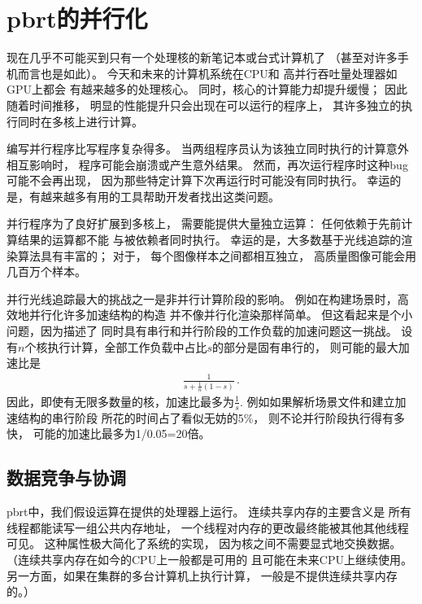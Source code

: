 \section{pbrt的并行化}\label{sec:pbrt的并行化}

现在几乎不可能买到只有一个处理核的新笔记本或台式计算机了
（甚至对许多手机而言也是如此）。
今天和未来的计算机系统在CPU和
高并行吞吐量处理器如GPU上都会
有越来越多的处理核心。
同时，核心的计算能力却提升缓慢；
因此随着时间推移，
明显的性能提升只会出现在可以运行的程序上，
其许多独立的执行同时在多核上进行计算。

编写并行程序比写程序复杂得多。
当两组程序员认为该独立同时执行的计算意外相互影响时，
程序可能会崩溃或产生意外结果。
然而，再次运行程序时这种bug可能不会再出现，
因为那些特定计算下次再运行时可能没有同时执行。
幸运的是，有越来越多有用的工具帮助开发者找出这类问题。

并行程序为了良好扩展到多核上，
需要能提供大量独立运算：
任何依赖于先前计算结果的运算都不能
与被依赖者同时执行。
幸运的是，大多数基于光线追踪的渲染算法具有丰富的；
对于，
每个图像样本之间都相互独立，
高质量图像可能会用几百万个样本。

并行光线追踪最大的挑战之一是非并行计算阶段的影响。
例如在构建场景时，高效地并行化许多加速结构的构造
并不像并行化渲染那样简单。
但这看起来是个小问题，因为描述了
同时具有串行和并行阶段的工作负载的加速问题这一挑战。
设有$n$个核执行计算，全部工作负载中占比$s$的部分是固有串行的，
则可能的最大加速比是
\begin{align*}
    \frac{1}{\displaystyle s+\frac{1}{n}(1-s)}\, .
\end{align*}
因此，即使有无限多数量的核，加速比最多为$\displaystyle\frac{1}{s}$.
例如如果解析场景文件和建立加速结构的串行阶段
所花的时间占了看似无妨的5\%，
则不论并行阶段执行得有多快，
可能的加速比最多为1/0.05=20倍。

\subsection{数据竞争与协调}
pbrt中，我们假设运算在提供的处理器上运行。
连续共享内存的主要含义是
所有线程都能读写一组公共内存地址，
一个线程对内存的更改最终能被其他其他线程可见。
这种属性极大简化了系统的实现，
因为核之间不需要显式地交换数据。
（连续共享内存在如今的CPU上一般都是可用的
且可能在未来CPU上继续使用。
另一方面，如果在集群的多台计算机上执行计算，
一般是不提供连续共享内存的。）

